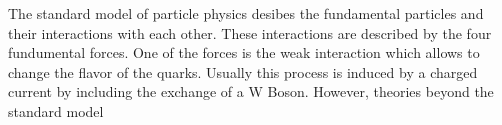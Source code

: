 \documentclass{scdpg}
\begin{document}
\begin{scAbstract}
{}
\scBeginText
The standard model of particle physics desibes the fundamental particles and their interactions with each other.
These interactions are described by the four fundumental forces.
One of the forces is the weak interaction which allows to change the flavor of the quarks.
Usually this process is induced by a charged current by including the exchange of a W Boson.
However, theories beyond the standard model 

\scEndText
{}
\scCountry{}
\end{scAbstract}
\end{document}
